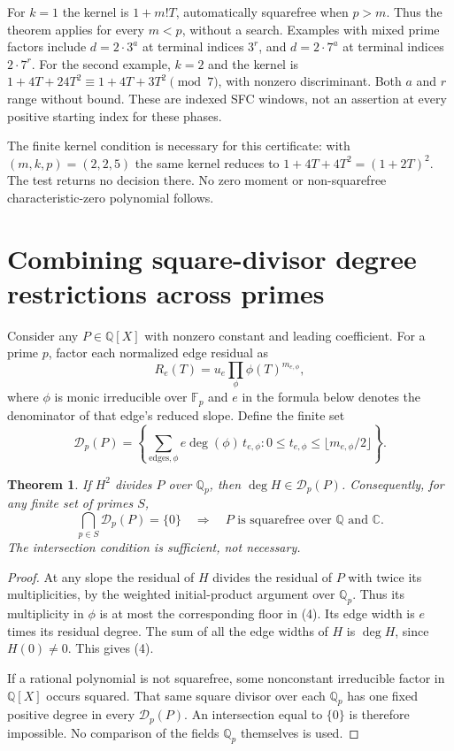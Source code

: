 \documentclass[11pt]{article}
\newtheorem{theorem}{Theorem}
\newcommand{\Q}{\mathbb Q}
\newcommand{\C}{\mathbb C}
\newcommand{\F}{\mathbb F}
\begin{document}
For $k=1$ the kernel is $1+m!T$, automatically squarefree when $p>m$.
Thus the theorem applies for every $m<p$, without a search.
Examples with mixed prime factors include $d=2\cdot3^a$ at terminal
indices $3^r$, and $d=2\cdot7^a$ at terminal indices $2\cdot7^r$.
For the second example, $k=2$ and the kernel is
$1+4T+24T^2\equiv1+4T+3T^2\pmod7$, with nonzero discriminant.
Both $a$ and $r$ range without bound. These are indexed SFC windows,
not an assertion at every positive starting index for these phases.

The finite kernel condition is necessary for this certificate: with
$(m,k,p)=(2,2,5)$ the same kernel reduces to
$1+4T+4T^2=(1+2T)^2$. The test returns no decision there.
No zero moment or non-squarefree characteristic-zero polynomial follows.

\section{Combining square-divisor degree restrictions across primes}
Consider any $P\in\Q[X]$ with nonzero constant and leading coefficient.
For a prime $p$, factor each normalized edge residual as
\[
 R_e(T)=u_e\prod_\phi\phi(T)^{m_{e,\phi}},
\]
where $\phi$ is monic irreducible over $\F_p$ and $e$ in the formula
below denotes the denominator of that edge's reduced slope. Define
the finite set
\[
 \mathcal D_p(P)=
 \left\{\sum_{\text{edges},\phi} e\deg(\phi)\,t_{e,\phi}:
              0\le t_{e,\phi}\le\lfloor m_{e,\phi}/2\rfloor\right\}. \tag{4}
\]

\begin{theorem}\label{thm:degree}
If $H^2$ divides $P$ over $\Q_p$, then $\deg H\in\mathcal D_p(P)$.
Consequently, for any finite set of primes $S$,
\[
 \bigcap_{p\in S}\mathcal D_p(P)=\{0\}
 \quad\Longrightarrow\quad P\text{ is squarefree over }\Q\text{ and }\C.
\]
The intersection condition is sufficient, not necessary.
\end{theorem}
\begin{proof}
At any slope the residual of $H$ divides the residual of $P$ with twice
its multiplicities, by the weighted initial-product argument over $\Q_p$.
Thus its multiplicity in $\phi$ is at most the corresponding floor in (4).
Its edge width is $e$ times its residual degree. The sum of all the
edge widths of $H$ is $\deg H$, since $H(0)\ne0$. This gives (4).

If a rational polynomial is not squarefree, some nonconstant irreducible
factor in $\Q[X]$ occurs squared. That same square divisor over each
$\Q_p$ has one fixed positive degree in every $\mathcal D_p(P)$.
An intersection equal to $\{0\}$ is therefore impossible.
No comparison of the fields $\Q_p$ themselves is used.
\end{proof}
\end{document}
